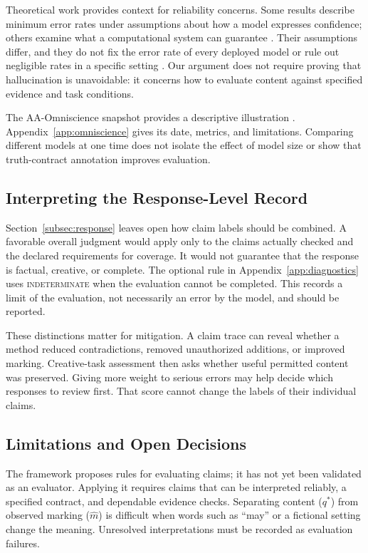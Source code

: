 \documentclass{clv2025}
\begin{document}
Theoretical work provides context for reliability concerns. Some results
describe minimum error rates under assumptions about how a model expresses
confidence; others examine what a computational system can guarantee
\citep{kalai_calibrated_2024,xu_hallucination_2024,banerjee_llms_2024}.
Their assumptions differ, and they do not fix the error rate of every
deployed model or rule out negligible rates in a specific setting
\citep{suzuki_negligible_2025}. Our argument does not require proving that
hallucination is unavoidable: it concerns how to evaluate content against
specified evidence and task conditions.

The AA-Omniscience snapshot provides a descriptive
illustration \citep{jackson_aaomniscience_2025,artificialanalysis_omniscience_leaderboard_2026}.
Appendix~\ref{app:omniscience} gives its date, metrics, and limitations.
Comparing different models at one time does not isolate the effect of model
size or show that truth-contract annotation improves evaluation.

\subsection{Interpreting the Response-Level Record}

Section~\ref{subsec:response} leaves open how claim labels should be combined.
A favorable overall judgment would apply only to the claims actually checked
and the declared requirements for coverage. It would not guarantee that the
response is factual, creative, or complete. The optional rule in
Appendix~\ref{app:diagnostics} uses \textsc{indeterminate} when the evaluation
cannot be completed. This records a limit of the evaluation, not necessarily
an error by the model, and should be reported.

These distinctions matter for mitigation. A claim trace can reveal whether a
method reduced contradictions, removed unauthorized additions, or improved
marking. Creative-task assessment then asks whether useful permitted content
was preserved. Giving more weight to serious errors may help decide which
responses to review first. That score cannot change the labels of their
individual claims.

\subsection{Limitations and Open Decisions}

The framework proposes rules for evaluating claims; it has not yet been
validated as an evaluator. Applying it requires claims that can be interpreted
reliably, a specified contract, and dependable evidence checks. Separating
content ($q^*$) from observed marking ($\widehat{m}$) is difficult when words
such as ``may'' or a fictional setting change the meaning. Unresolved interpretations
must be recorded as evaluation failures.
\end{document}

